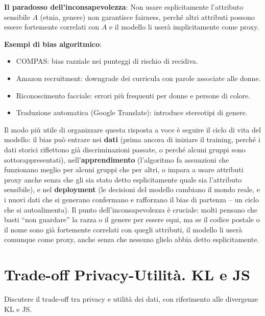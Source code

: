 \documentclass[a4paper,11pt]{article}
\begin{document}
\textbf{Il paradosso dell'inconsapevolezza}: Non usare esplicitamente l'attributo sensibile $A$ (etnia, genere) non garantisce fairness, perch\'{e} altri attributi possono essere fortemente correlati con $A$ e il modello li user\`{a} implicitamente come proxy.

\textbf{Esempi di bias algoritmico}:
\begin{itemize}
  \item COMPAS: bias razziale nei punteggi di rischio di recidiva.
  \item Amazon recruitment: downgrade dei curricula con parole associate alle donne.
  \item Riconoscimento facciale: errori pi\`{u} frequenti per donne e persone di colore.
  \item Traduzione automatica (Google Translate): introduce stereotipi di genere.
\end{itemize}

\begin{nota}
Il modo pi\`{u} utile di organizzare questa risposta a voce \`{e} seguire il ciclo di vita del modello: il bias pu\`{o} entrare nei \textbf{dati} (prima ancora di iniziare il training, perch\'{e} i dati storici riflettono gi\`{a} discriminazioni passate, o perch\'{e} alcuni gruppi sono sottorappresentati), nell'\textbf{apprendimento} (l'algoritmo fa assunzioni che funzionano meglio per alcuni gruppi che per altri, o impara a usare attributi proxy anche senza che gli sia stato detto esplicitamente quale sia l'attributo sensibile), e nel \textbf{deployment} (le decisioni del modello cambiano il mondo reale, e i nuovi dati che si generano confermano e rafforzano il bias di partenza -- un ciclo che si autoalimenta). Il punto dell'inconsapevolezza \`{e} cruciale: molti pensano che basti ``non guardare'' la razza o il genere per essere equi, ma se il codice postale o il nome sono gi\`{a} fortemente correlati con quegli attributi, il modello li user\`{a} comunque come proxy, anche senza che nessuno glielo abbia detto esplicitamente.
\end{nota}

\section{Trade-off Privacy-Utilit\`{a}. KL e JS}

\begin{domanda}
Discutere il trade-off tra privacy e utilit\`{a} dei dati, con riferimento alle divergenze KL e JS.
\end{domanda}
\end{document}
